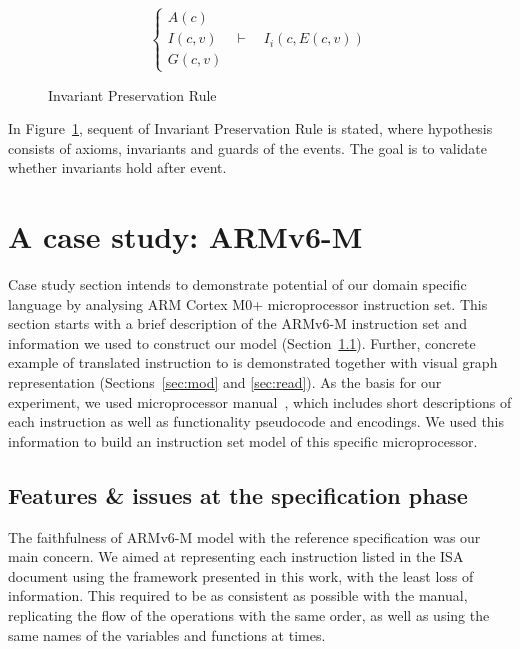 \documentclass[conference]{IEEEtran}
\begin{document}
\begin{figure}[ht!]
\begin{center}
	$$\begin{cases}
	A(c)\\
	I(c, v) & \vdash \quad I_i(c, E(c,v))\\
	G(c, v)
  \end{cases}$$
	\caption{Invariant Preservation Rule}
	\label{fig:eveB}
\end{center}
\end{figure}

In Figure~\ref{fig:eveB}, sequent of Invariant Preservation Rule is stated, where hypothesis
consists of axioms, invariants and guards of the events. The goal is to validate whether
invariants hold after event.


\section{A case study: ARMv6-M}
\label{sec:arm}
Case study section intends to demonstrate potential of our domain specific language by
analysing ARM Cortex M0+ microprocessor instruction set. This section starts with a brief
description of the ARMv6-M instruction set and information we used to construct our model
(Section~\ref{sec:feat}). Further, concrete example of translated instruction to is
demonstrated together with visual graph representation (Sections~\ref{sec:mod} and
\ref{sec:read}). As the basis for our experiment, we used microprocessor
manual~\cite{armManual}, which includes short descriptions of each instruction as well as
functionality pseudocode and encodings. We used this information to build an instruction set
model of this specific microprocessor. 

\subsection{Features \& issues at the specification phase}
\label{sec:feat}
The faithfulness of ARMv6-M model with the reference specification was our main concern.
We aimed at representing each instruction listed in the ISA document using the
framework presented in this work, with the least loss of information. This required to be
as consistent as possible with the manual, replicating the flow of the operations with
the same order, as well as using the same names of the variables and functions at times.
\end{document}

